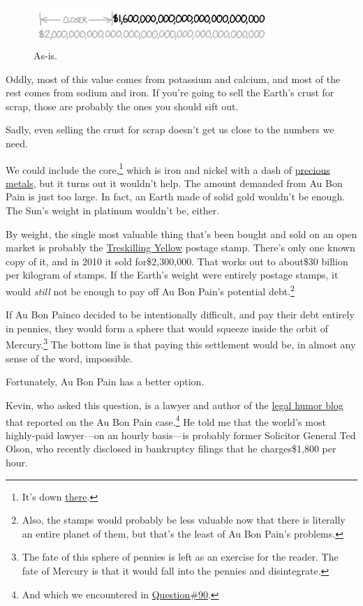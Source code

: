 {\begin{figure}[!htbp]
\centering
\includegraphics[scale=0.5, max width=0.8\textwidth]{imgs/a/96/crust.png}
\caption{As-is.}
\end{figure}

{Oddly, most of this value comes from potassium and calcium, and most of the rest comes from sodium and iron. If you're going to sell the Earth's crust for scrap, those are probably the ones you should sift out.}

{Sadly, even selling the crust for scrap doesn't get us close to the numbers we need.}

{We could include the core,{\footnote{It's down \href{http://xkcd.com/913/}{there}.} } which is iron and nickel with a dash of \href{http://discovermagazine.com/2006/sep/innerfortknox} {precious metals}, but it turns out it wouldn't help. The amount demanded from Au Bon Pain is just too large. In fact, an Earth made of solid gold wouldn't be enough. The Sun's weight in platinum wouldn't be, either.}

{By weight, the single most valuable thing that's been bought and sold on an open market is probably the \href{http://en.wikipedia.org/wiki/Treskilling\_Yellow}{Treskilling Yellow} postage stamp. There's only one known copy of it, and in 2010 it sold for\$2,300,000. That works out to about\$30 billion per kilogram of stamps. If the Earth's weight were entirely postage stamps, it would \emph{still} not be enough to pay off Au Bon Pain's potential debt.{\footnote{Also, the stamps would probably be less valuable now that there is literally an entire planet of them, but that's the least of Au Bon Pain's problems.} } }

{If Au Bon Painco decided to be intentionally difficult, and pay their debt entirely in pennies, they would form a sphere that would squeeze inside the orbit of Mercury.{\footnote{The fate of this sphere of pennies is left as an exercise for the reader. The fate of Mercury is that it would fall into the pennies and disintegrate.} } The bottom line is that paying this settlement would be, in almost any sense of the word, impossible.}

{Fortunately, Au Bon Pain has a better option.}

{Kevin, who asked this question, is a lawyer and author of the \href{http://www.loweringthebar.net/}{legal humor blog} that reported on the Au Bon Pain case.{\footnote{And which we encountered in \href{http://what-if.xkcd.com/90/} {Question\#90}.} } He told me that the world's most highly-paid lawyer—on an hourly basis—is probably former Solicitor General Ted Olson, who recently disclosed in bankruptcy filings that he charges\$1,800 per hour.}

}
